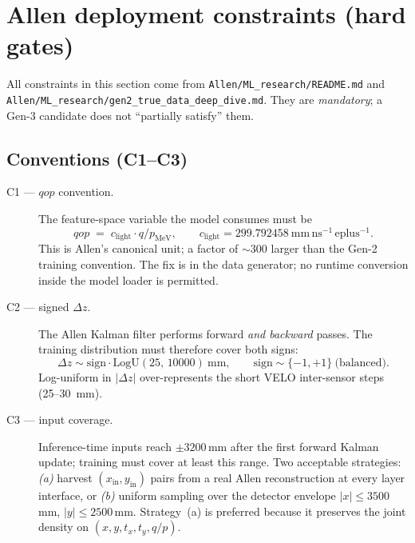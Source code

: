\documentclass[a4paper,11pt]{article}
\newcommand{\SIrange}[3]{#1--#2~#3}
\newcommand{\mm}{mm}
\newcommand{\dz}{\Delta z}
\begin{document}
\section{Allen deployment constraints (hard gates)}\label{gen3:sec:allen}

All constraints in this section come from
\texttt{Allen/ML\_research/README.md} and
\texttt{Allen/ML\_research/gen2\_true\_data\_deep\_dive.md}.  They are
\emph{mandatory}; a Gen-3 candidate does not ``partially satisfy''
them.

\subsection{Conventions (C1--C3)}

\begin{description}
  \item[C1 --- $qop$ convention.] The feature-space variable the
        model consumes must be
        \begin{equation}
          qop \;=\; c_\text{light} \cdot q / p_\text{MeV},
          \qquad c_\text{light} = 299.792458\ \mathrm{mm\,ns^{-1}\,eplus^{-1}}.
          \label{eq:qop}
        \end{equation}
        This is Allen's canonical unit; a factor of $\sim300$ larger
        than the Gen-2 training convention.  The fix is in the data
        generator; no runtime conversion inside the model loader is
        permitted.
  \item[C2 --- signed $\dz$.]  The Allen Kalman filter performs
        forward \emph{and backward} passes.  The training
        distribution must therefore cover both signs:
        \begin{equation}
          \dz \sim \text{sign}\cdot\text{LogU}(25,\,10000)\ \mathrm{mm},
          \qquad \text{sign} \sim \{-1,+1\}\ \text{(balanced)}.
          \label{eq:dz_signed}
        \end{equation}
        Log-uniform in $|\dz|$ over-represents the short VELO
        inter-sensor steps (\SIrange{25}{30}{\mm}).
  \item[C3 --- input coverage.]  Inference-time inputs reach $\pm
        3200$\,mm after the first forward Kalman update; training
        must cover at least this range.  Two acceptable strategies:
        \emph{(a)} harvest $(x_\mathrm{in},y_\mathrm{in})$ pairs from
        a real Allen reconstruction at every layer interface, or
        \emph{(b)} uniform sampling over the detector envelope
        $|x|\le3500$\,mm, $|y|\le2500$\,mm.  Strategy~(a) is
        preferred because it preserves the joint density on
        $(x,y,t_x,t_y,q/p)$.
\end{description}
\end{document}
